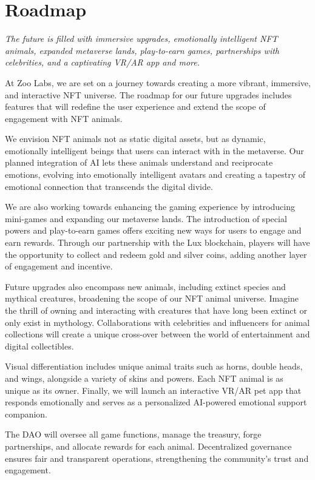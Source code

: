 \section{Roadmap}
\label{sec:roadmap}

\textit{The future is filled with immersive upgrades, emotionally intelligent NFT animals, expanded metaverse lands, play-to-earn games, partnerships with celebrities, and a captivating VR/AR app and more.}

At Zoo Labs, we are set on a journey towards creating a more vibrant, immersive, and interactive NFT universe. The roadmap for our future upgrades includes features that will redefine the user experience and extend the scope of engagement with NFT animals.

We envision NFT animals not as static digital assets, but as dynamic, emotionally intelligent beings that users can interact with in the metaverse. Our planned integration of AI lets these animals understand and reciprocate emotions, evolving into emotionally intelligent avatars and creating a tapestry of emotional connection that transcends the digital divide.

We are also working towards enhancing the gaming experience by introducing mini-games and expanding our metaverse lands. The introduction of special powers and play-to-earn games offers exciting new ways for users to engage and earn rewards. Through our partnership with the Lux blockchain, players will have the opportunity to collect and redeem gold and silver coins, adding another layer of engagement and incentive.

Future upgrades also encompass new animals, including extinct species and mythical creatures, broadening the scope of our NFT animal universe. Imagine the thrill of owning and interacting with creatures that have long been extinct or only exist in mythology. Collaborations with celebrities and influencers for animal collections will create a unique cross-over between the world of entertainment and digital collectibles.

Visual differentiation includes unique animal traits such as horns, double heads, and wings, alongside a variety of skins and powers. Each NFT animal is as unique as its owner. Finally, we will launch an interactive VR/AR pet app that responds emotionally and serves as a personalized AI-powered emotional support companion.

The DAO will oversee all game functions, manage the treasury, forge partnerships, and allocate rewards for each animal. Decentralized governance ensures fair and transparent operations, strengthening the community's trust and engagement.

